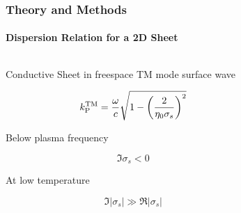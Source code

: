 \documentclass[mathserif,16pt,xcolor=table]{beamer}
\begin{document}
      \begin{frame}
        \frametitle{Theory and Methods}
        \framesubtitle{Dispersion Relation for a 2D Sheet}
        \begin{columns}[T] %
          \begin{column}{.5\textwidth}
            \begin{outline}[itemize]
              \1 Conductive Sheet in freespace
              \1 TM mode surface wave
            \end{outline}
            \begin{equation} \nonumber
              k^{\mathrm{TM}}_{\mathrm P} = \frac{\O}{c} \sqrt{1 - \left(\frac{2}{\eta_0 \sigma_s}\right)^2}
              \label{eq:TM_pole}%
            \end{equation}
            \begin{outline}[itemize]
              \1 Below plasma frequency
              \end{outline}
            \begin{equation} \nonumber
              \Im \sigma_s < 0
              \label{eq:2deg_surface_wave}%
            \end{equation}%
            \begin{outline}[itemize]
              \1 At low temperature
              \end{outline}%
            \begin{equation} \nonumber
              \Im |\sigma_s| \gg \Re |\sigma_s|
              \label{eq:2deg_low_loss}
            \end{equation}
          \end{column}
          \begin{column}[T]{.45\textwidth}
            \vspace*{-2cm}
            \centering
            \begin{figure}

            \end{figure}
          \end{column}
        \end{columns}
      \end{frame}
\end{document}
